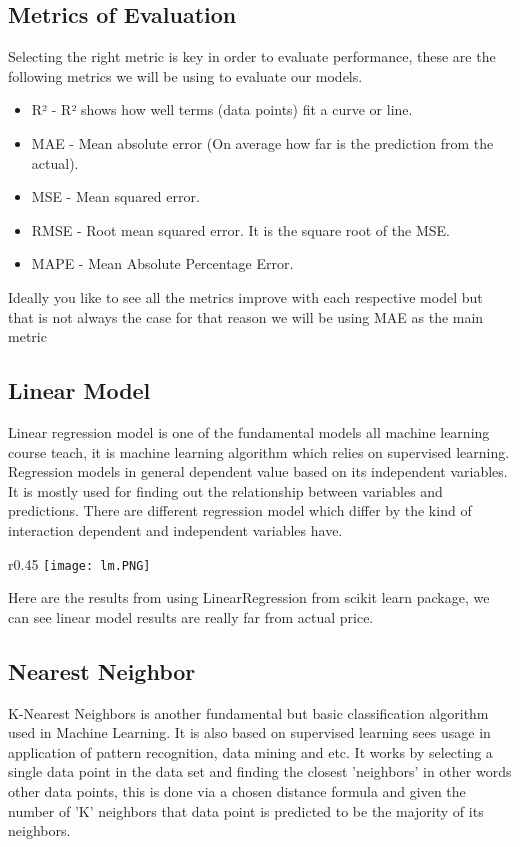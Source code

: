 \documentclass{article}
\begin{document}
\begin{titlepage}
\subsection{Metrics of Evaluation}
Selecting the right metric is key in order to evaluate performance, these are the following metrics we will be using to evaluate our models.
\begin{itemize}
  \item R² - R² shows how well terms (data points) fit a curve or line.
  \item MAE - Mean absolute error (On average how far is the prediction from the actual).
  \item MSE - Mean squared error.
  \item RMSE - Root mean squared error. It is the square root of the MSE.
  \item MAPE - Mean Absolute Percentage Error.
\end{itemize}
Ideally you like to see all the metrics improve with each respective model but that is not always the case for that reason we will be using MAE as the main metric
\subsection{Linear Model}
Linear regression model is one of the fundamental models all machine learning course teach, it is machine learning algorithm which relies on supervised learning. Regression models in general dependent value based on its independent variables. It is mostly used for finding out the relationship between variables and predictions. There are different regression model which differ by the kind of interaction dependent and independent variables have.
\\
\begin{wrapfigure}{r}{0.45\textwidth}
\texttt{[image: lm.PNG]}
\label{fig:wrapfig2}
\end{wrapfigure}
Here are the results from using LinearRegression from scikit learn package, we can see linear model results are really far from actual price.
\subsection{Nearest Neighbor}


K-Nearest Neighbors is another fundamental but basic classification algorithm used in Machine Learning. It is also based on supervised learning sees usage in application of pattern recognition, data mining and etc. It works by selecting a single data point in the data set and finding the closest 'neighbors' in other words other data points, this is done via a chosen distance formula and given the number of 'K' neighbors that data point is predicted to be the majority of its neighbors.


\end{titlepage}
\end{document}
